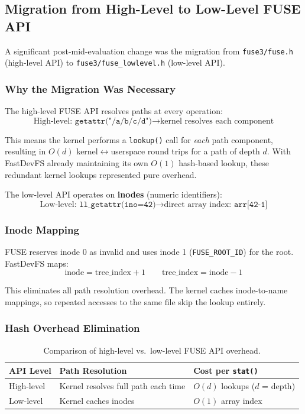 \documentclass[12pt, a4paper]{article}
\begin{document}
\subsection{Migration from High-Level to Low-Level FUSE API}
\label{sec:fuse-migration}

A significant post-mid-evaluation change was the migration from \texttt{fuse3/fuse.h} (high-level API) to \texttt{fuse3/fuse\_lowlevel.h} (low-level API).

\subsubsection{Why the Migration Was Necessary}

The high-level FUSE API resolves paths at every operation:
$$\text{High-level: } \texttt{getattr("/a/b/c/d")} \to \text{kernel resolves each component}$$

This means the kernel performs a \texttt{lookup()} call for \textit{each} path component, resulting in $O(d)$ kernel$\leftrightarrow$userspace round trips for a path of depth $d$. With FastDevFS already maintaining its own $O(1)$ hash-based lookup, these redundant kernel lookups represented pure overhead.

The low-level API operates on \textbf{inodes} (numeric identifiers):
$$\text{Low-level: } \texttt{ll\_getattr(ino=42)} \to \text{direct array index: } \texttt{arr[42-1]}$$

\subsubsection{Inode Mapping}

FUSE reserves inode 0 as invalid and uses inode 1 (\texttt{FUSE\_ROOT\_ID}) for the root. FastDevFS maps:
$$\text{inode} = \text{tree\_index} + 1 \qquad \text{tree\_index} = \text{inode} - 1$$

This eliminates all path resolution overhead. The kernel caches inode-to-name mappings, so repeated accesses to the same file skip the lookup entirely.

\subsubsection{Hash Overhead Elimination}

\begin{table}[H]
\centering
\begin{tabular}{lll}
\toprule
\textbf{API Level} & \textbf{Path Resolution} & \textbf{Cost per \texttt{stat()}} \\
\midrule
High-level & Kernel resolves full path each time & $O(d)$ lookups ($d$ = depth) \\
Low-level  & Kernel caches inodes & $O(1)$ array index \\
\bottomrule
\end{tabular}
\caption{Comparison of high-level vs.\ low-level FUSE API overhead.}
\end{table}
\end{document}

